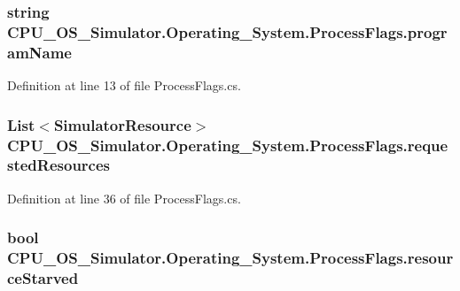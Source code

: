 \subsubsection[{program\+Name}]{\setlength{\rightskip}{0pt plus 5cm}string C\+P\+U\+\_\+\+O\+S\+\_\+\+Simulator.\+Operating\+\_\+\+System.\+Process\+Flags.\+program\+Name}\label{struct_c_p_u___o_s___simulator_1_1_operating___system_1_1_process_flags_af219a7a8b99d0c94b5847797dabb39f6}


Definition at line 13 of file Process\+Flags.\+cs.

\hypertarget{struct_c_p_u___o_s___simulator_1_1_operating___system_1_1_process_flags_afa8f450b4825d1c204817af22729c05b}{}
\subsubsection[{requested\+Resources}]{\setlength{\rightskip}{0pt plus 5cm}List$<${\bf Simulator\+Resource}$>$ C\+P\+U\+\_\+\+O\+S\+\_\+\+Simulator.\+Operating\+\_\+\+System.\+Process\+Flags.\+requested\+Resources}\label{struct_c_p_u___o_s___simulator_1_1_operating___system_1_1_process_flags_afa8f450b4825d1c204817af22729c05b}


Definition at line 36 of file Process\+Flags.\+cs.

\hypertarget{struct_c_p_u___o_s___simulator_1_1_operating___system_1_1_process_flags_abc77938558baa106a799492596c9178b}{}
\subsubsection[{resource\+Starved}]{\setlength{\rightskip}{0pt plus 5cm}bool C\+P\+U\+\_\+\+O\+S\+\_\+\+Simulator.\+Operating\+\_\+\+System.\+Process\+Flags.\+resource\+Starved}\label{struct_c_p_u___o_s___simulator_1_1_operating___system_1_1_process_flags_abc77938558baa106a799492596c9178b}


